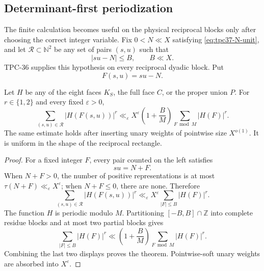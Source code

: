 \subsection{Determinant-first periodization}

The finite calculation becomes useful on the physical reciprocal blocks
only after choosing the correct integer variable.  Fix \(0<N\ll X\)
satisfying \eqref{eq:tpc37-N-unit}, and let
\(\mathcal R\subset\mathbb N^2\) be any set of pairs \((s,u)\) such that
\begin{equation}
 |su-N|\le B,
 \qquad B\ll X.
 \label{eq:tpc37-determinant-range}
\end{equation}
TPC-36 supplies this hypothesis on every reciprocal dyadic block.  Put
\begin{equation}
 F(s,u)=su-N.
 \label{eq:tpc37-integer-determinant}
\end{equation}

\begin{theorem}
\label{thm:tpc37-determinant-periodization}
Let \(H\) be any of the eight faces \(K_S\), the full face \(C\), or the
proper union \(P\).  For \(r\in\{1,2\}\) and every fixed
\(\varepsilon>0\),
\begin{equation}
 \boxed{
 \sum_{(s,u)\in\mathcal R}|H(F(s,u))|^r
 \ll_{\varepsilon}
 X^{\varepsilon}
 \left(1+\frac BM\right)
 \sum_{F\bmod M}|H(F)|^r.}
 \label{eq:tpc37-determinant-periodization-bound}
\end{equation}
The same estimate holds after inserting unary weights of pointwise size
\(X^{o(1)}\).  It is uniform in the shape of the reciprocal rectangle.
\end{theorem}

\begin{proof}
For a fixed integer \(F\), every pair counted on the left satisfies
\begin{equation}
 su=N+F.
 \label{eq:tpc37-fixed-determinant-factorization}
\end{equation}
When \(N+F>0\), the number of positive representations is at most
\(\tau(N+F)\ll_\varepsilon X^\varepsilon\); when \(N+F\le0\), there are
none.  Therefore
\begin{equation}
 \sum_{(s,u)\in\mathcal R}|H(F(s,u))|^r
 \ll_\varepsilon X^\varepsilon
 \sum_{|F|\le B}|H(F)|^r.
 \label{eq:tpc37-divisor-multiplicity-reduction}
\end{equation}
The function \(H\) is periodic modulo \(M\).  Partitioning
\([-B,B]\cap\mathbb Z\) into complete residue blocks and at most two
partial blocks gives
\begin{equation}
 \sum_{|F|\le B}|H(F)|^r
 \ll\left(1+\frac BM\right)
 \sum_{F\bmod M}|H(F)|^r.
 \label{eq:tpc37-period-block-bound}
\end{equation}
Combining the last two displays proves the theorem.  Pointwise-soft unary
weights are absorbed into \(X^\varepsilon\).
\end{proof}

